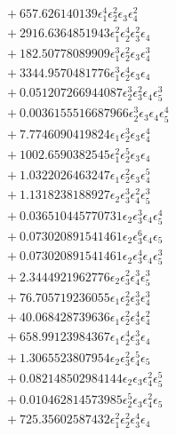 \documentclass[10pt]{article}
\begin{document}
\begin{align*}
&{}  + 657.626140139 \epsilon_{1}^{4} \epsilon_{2}^{2} \epsilon_{3} \epsilon_{4}^{2} \\
&{}  + 2916.6364851943 \epsilon_{1}^{2} \epsilon_{2}^{4} \epsilon_{3}^{2} \epsilon_{4} \\
&{}  + 182.50778089909 \epsilon_{1}^{3} \epsilon_{2}^{2} \epsilon_{3} \epsilon_{4}^{3} \\
&{}  + 3344.9570481776 \epsilon_{1}^{3} \epsilon_{2}^{4} \epsilon_{3} \epsilon_{4} \\
&{}  + 0.051207266944087 \epsilon_{2}^{3} \epsilon_{3}^{2} \epsilon_{4} \epsilon_{5}^{3} \\
&{}  + 0.0036155516687966 \epsilon_{2}^{3} \epsilon_{3} \epsilon_{4} \epsilon_{5}^{4} \\
&{}  + 7.7746090419824 \epsilon_{1} \epsilon_{2}^{3} \epsilon_{3} \epsilon_{4}^{4} \\
&{}  + 1002.6590382545 \epsilon_{1}^{2} \epsilon_{2}^{5} \epsilon_{3} \epsilon_{4} \\
&{}  + 1.0322026463247 \epsilon_{1} \epsilon_{2}^{2} \epsilon_{3} \epsilon_{4}^{5} \\
&{}  + 1.1318238188927 \epsilon_{2} \epsilon_{3}^{3} \epsilon_{4}^{2} \epsilon_{5}^{3} \\
&{}  + 0.036510445770731 \epsilon_{2} \epsilon_{3}^{3} \epsilon_{4} \epsilon_{5}^{4} \\
&{}  + 0.073020891541461 \epsilon_{2} \epsilon_{3}^{6} \epsilon_{4} \epsilon_{5} \\
&{}  + 0.073020891541461 \epsilon_{2} \epsilon_{3}^{4} \epsilon_{4} \epsilon_{5}^{3} \\
&{}  + 2.3444921962776 \epsilon_{2} \epsilon_{3}^{2} \epsilon_{4}^{3} \epsilon_{5}^{3} \\
&{}  + 76.705719236055 \epsilon_{1} \epsilon_{2}^{2} \epsilon_{3}^{3} \epsilon_{4}^{3} \\
&{}  + 40.068428739636 \epsilon_{1} \epsilon_{2}^{2} \epsilon_{3}^{4} \epsilon_{4}^{2} \\
&{}  + 658.99123984367 \epsilon_{1} \epsilon_{2}^{4} \epsilon_{3}^{3} \epsilon_{4} \\
&{}  + 1.3065523807954 \epsilon_{2} \epsilon_{3}^{2} \epsilon_{4}^{5} \epsilon_{5} \\
&{}  + 0.082148502984144 \epsilon_{2} \epsilon_{3} \epsilon_{4}^{2} \epsilon_{5}^{5} \\
&{}  + 0.010462814573985 \epsilon_{2}^{5} \epsilon_{3} \epsilon_{4}^{2} \epsilon_{5} \\
&{}  + 725.35602587432 \epsilon_{1}^{2} \epsilon_{2}^{2} \epsilon_{3}^{4} \epsilon_{4} \\

\end{align*}
\end{document}
